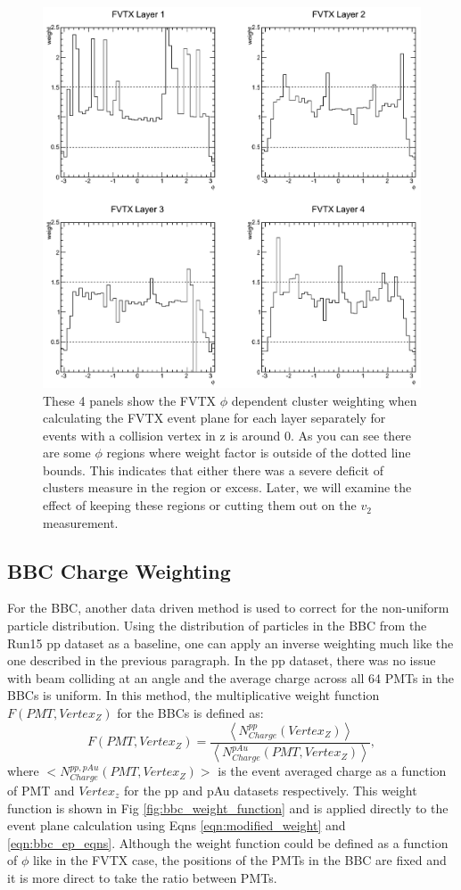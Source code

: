 \begin{figure}[h!]
\begin{center}
\includegraphics[width=0.75\linewidth]{figs/fvtx_weighting.png}
\caption{These 4 panels show the FVTX $\phi$ dependent cluster weighting when calculating the FVTX event plane for each layer separately for events with a collision vertex in z is around 0. As you can see there are some $\phi$ regions where weight factor is outside of the dotted line bounds. This indicates that either there was a severe deficit of clusters measure in the region or excess. Later, we will examine the effect of keeping these regions or cutting them out on the $v_2$ measurement.}
\label{fig:diagram2}
\end{center}
\end{figure}

\subsection{BBC Charge Weighting}
For the BBC, another data driven method is used to correct for the non-uniform particle distribution. Using the distribution of particles in the BBC from the Run15 pp dataset as a baseline, one can apply an inverse weighting much like the one described in the previous paragraph. In the pp dataset, there was no issue with beam colliding at an angle and the average charge across all 64 PMTs in the BBCs is uniform. In this method, the multiplicative weight function $F(PMT,Vertex_Z)$ for the BBCs is defined as:
\begin{equation}
F(PMT,Vertex_Z) = \frac{\left<N^{pp}_{Charge}(Vertex_Z)\right>}{\left<N^{pAu}_{Charge}(PMT,Vertex_Z)\right>},
\end{equation}
where $<N^{pp,pAu}_{Charge}(PMT,Vertex_Z)>$ is the event averaged charge as a function of PMT and $Vertex_z$ for the pp and pAu datasets respectively. 
This weight function is shown in Fig \ref{fig:bbc_weight_function} and is applied directly to the event plane calculation using Eqns \ref{eqn:modified_weight} and \ref{eqn:bbc_ep_eqns}. 
Although the weight function could be defined as a function of $\phi$ like in the FVTX case, the positions of the PMTs in the BBC are fixed and it is more direct to take the ratio between PMTs.

